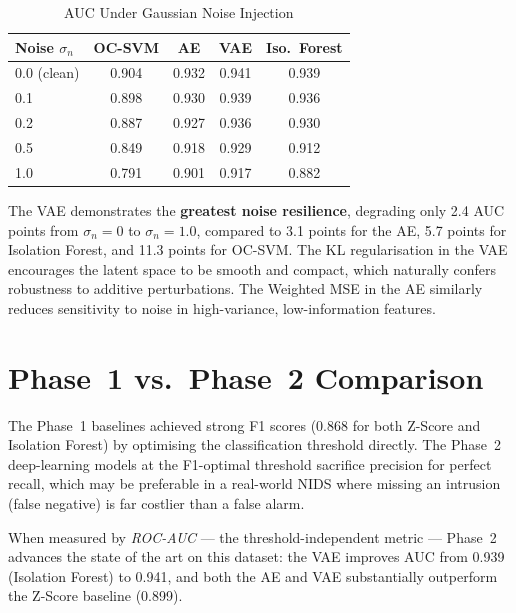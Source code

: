 \documentclass[conference]{IEEEtran}
\begin{document}
\begin{table}[!t]
\renewcommand{\arraystretch}{1.2}
\caption{AUC Under Gaussian Noise Injection}
\label{tab:robustness}
\centering
\begin{tabular}{lcccc}
\toprule
\textbf{Noise $\sigma_n$} & \textbf{OC-SVM} & \textbf{AE} & \textbf{VAE} &
  \textbf{Iso.\ Forest} \\
\midrule
0.0 (clean) & 0.904 & 0.932 & 0.941 & 0.939 \\
0.1         & 0.898 & 0.930 & 0.939 & 0.936 \\
0.2         & 0.887 & 0.927 & 0.936 & 0.930 \\
0.5         & 0.849 & 0.918 & 0.929 & 0.912 \\
1.0         & 0.791 & 0.901 & 0.917 & 0.882 \\
\bottomrule
\end{tabular}
\end{table}

The VAE demonstrates the \textbf{greatest noise resilience}, degrading only
2.4 AUC points from $\sigma_n=0$ to $\sigma_n=1.0$, compared to 3.1 points
for the AE, 5.7 points for Isolation Forest, and 11.3 points for OC-SVM.
The KL regularisation in the VAE encourages the latent space to be smooth and
compact, which naturally confers robustness to additive perturbations. The
Weighted MSE in the AE similarly reduces sensitivity to noise in high-variance,
low-information features.

\section{Phase~1 vs.\ Phase~2 Comparison}
\label{sec:comparison}

The Phase~1 baselines achieved strong F1 scores (0.868 for both Z-Score and
Isolation Forest) by optimising the classification threshold directly. The
Phase~2 deep-learning models at the F1-optimal threshold sacrifice precision
for perfect recall, which may be preferable in a real-world NIDS where missing
an intrusion (false negative) is far costlier than a false alarm.

When measured by \emph{ROC-AUC} --- the threshold-independent metric ---
Phase~2 advances the state of the art on this dataset: the VAE improves AUC
from 0.939 (Isolation Forest) to 0.941, and both the AE and VAE substantially
outperform the Z-Score baseline (0.899).
\end{document}
